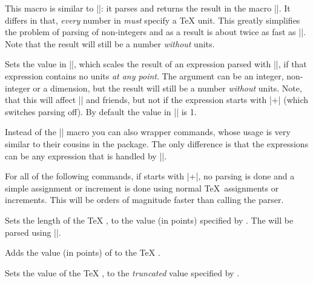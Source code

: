 \begin{command}{\pgfmathqparse{}}
  This macro is similar to |\pgfmathparse|: it parses 
   and returns the result in the macro 
  |\pgfmathresult|. It differs in that, \emph{every} number in
   \emph{must} specify a \TeX{} unit. This greatly
  simplifies the problem of parsing of non-integers and as a result
  is about twice as fast as |\pgfmathparse|. Note that the result will 
  still be a number \emph{without} units.	
\end{command}

\begin{command}{\pgfmathsetresultunitscale{}}
  Sets the value in |\pgfmathresultunitscale|, which scales the result
  of an expression parsed with |\pgfmathparse|, if that expression
  contains no units \emph{at any point}. The argument can be an integer,
  non-integer or a dimension, but the result will still be a number 
  \emph{without} units. Note, that this will affect |\pgfmathsetlength| 
  and friends, but not if the expression starts with |+| (which
  switches parsing off). By default the value in
  |\pgfmathresultunitscale| is 1. 
\end{command}

Instead of the |\pgfmathparse| macro you can also wrapper commands,
whose usage is very similar to their cousins in the \calcname{} 
package. The only difference is that the expressions can be any
expression that is handled by |\pgfmathparse|.

For all of the following commands, if  starts with
|+|, no parsing is done and a simple assignment or increment is done
using normal \TeX\ assignments or increments. This will be orders of
magnitude faster than calling the parser. 

\begin{command}{\pgfmathsetlength{}}
  Sets the length of the \TeX{} , to the value
  (in points) specified by . The 
  will be parsed using |\pgfmathparse|.
\end{command}

\begin{command}{\pgfmathaddtolength{}}
  Adds the value (in points) of  to the \TeX{} 
  . 
\end{command}

\begin{command}{\pgfmathsetcount{}}
  Sets the value of the \TeX{} , to the 
  \emph{truncated} value specified by . 
\end{command}

